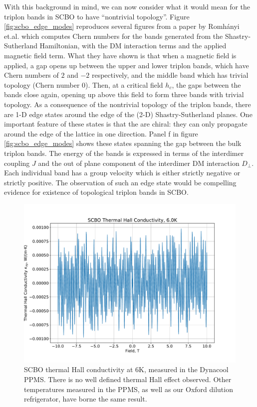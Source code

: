 \documentclass{thesis-umich}
\begin{document}
With this background in mind, we can now consider what it would mean for the triplon bands in SCBO to have ``nontrivial topology''. Figure \ref{fig:scbo_edge_modes} reproduces several figures from a paper by Romh\'{a}nyi et.al. which computes Chern numbers for the bands generated from the Shastry-Sutherland Hamiltonian, with the DM interaction terms and the applied magnetic field term. What they have shown is that when a magnetic field is applied, a gap opens up between the upper and lower triplon bands, which have Chern numbers of $2$ and $-2$ respectively, and the middle band which has trivial topology (Chern number 0). Then, at a critical field $h_c$, the gaps between the bands close again, opening up above this field to form three bands with trivial topology. As a consequence of the nontrivial topology of the triplon bands, there are 1-D edge states around the edge of the (2-D) Shastry-Sutherland planes. One important feature of these states is that the are chiral: they can only propagate around the edge of the lattice in one direction. Panel f in figure \ref{fig:scbo_edge_modes} shows these states spanning the gap between the bulk triplon bands. The energy of the bands is expressed in terms of the interdimer coupling $J$ and the out of plane component of the interdimer DM interaction $D_\perp$. Each individual band has a group velocity which is either strictly negative or strictly positive. The observation of such an edge state would be compelling evidence for existence of topological triplon bands in SCBO.

\begin{figure}
	\centering
	\caption[SCBO Thermal Hall: Negative Result]{SCBO thermal Hall conductivity at 6K, measured in the Dynacool PPMS. There is no well defined thermal Hall effect observed. Other temperatures measured in the PPMS, as well as our Oxford dilution refrigerator, have borne the same result.}
	\label{fig:scbo_thall_neg}
	\includegraphics[width=\columnwidth]{figures/SCBO_Thermal_Hall_Negative.pdf}
\end{figure}
\end{document}
